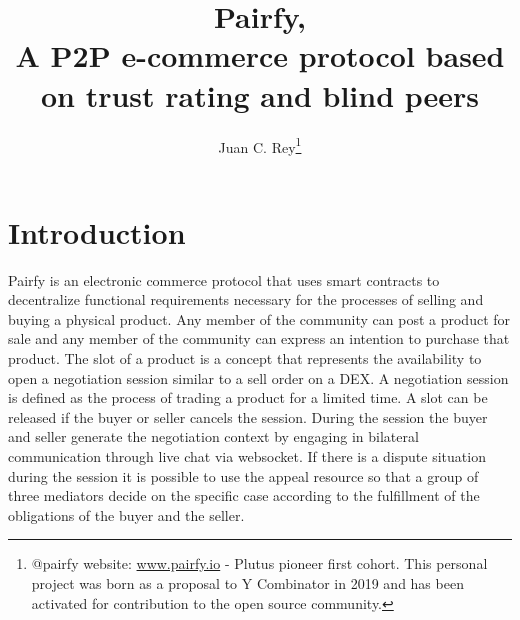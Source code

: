 \documentclass[12pt]{article}
\begin{document}
\title{\textbf{Pairfy,\\A P2P e-commerce protocol based on trust rating and blind peers }}

\author{Juan C. Rey\footnote{@pairfy  website: \url{www.pairfy.io} - Plutus pioneer first cohort. This personal project was born as a proposal to Y Combinator in 2019 and has been activated for contribution to the open source community.  }\\}

\maketitle

\renewcommand*\abstractname{\textbf{}\hfill}



\section{Introduction}

Pairfy is an electronic commerce protocol that uses smart contracts to decentralize functional requirements necessary for the processes of selling and buying a physical product.
Any member of the community can post a product for sale and any member of the community can express an intention to purchase that product.
The slot of a product is a concept that represents the availability to open a negotiation session similar to a sell order on a DEX. 
A negotiation session is defined as the process of trading a product for a limited time.
A slot can be released if the buyer or seller cancels the session.
During the session the buyer and seller generate the negotiation context by engaging in bilateral communication through live chat via websocket.
If there is a dispute situation during the session it is possible to use the appeal resource so that a group of three mediators decide on the specific case according to the fulfillment of the obligations of the buyer and the seller.
\end{document}
